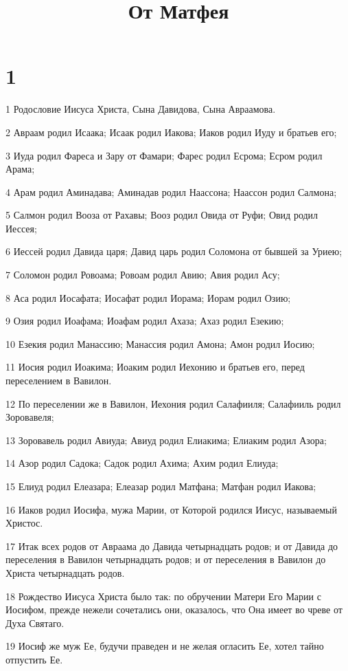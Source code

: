 

\title{От Матфея}


\chapter{1}

\par 1 Родословие Иисуса Христа, Сына Давидова, Сына Авраамова.
\par 2 Авраам родил Исаака; Исаак родил Иакова; Иаков родил Иуду и братьев его;
\par 3 Иуда родил Фареса и Зару от Фамари; Фарес родил Есрома; Есром родил Арама;
\par 4 Арам родил Аминадава; Аминадав родил Наассона; Наассон родил Салмона;
\par 5 Салмон родил Вооза от Рахавы; Вооз родил Овида от Руфи; Овид родил Иессея;
\par 6 Иессей родил Давида царя; Давид царь родил Соломона от бывшей за Уриею;
\par 7 Соломон родил Ровоама; Ровоам родил Авию; Авия родил Асу;
\par 8 Аса родил Иосафата; Иосафат родил Иорама; Иорам родил Озию;
\par 9 Озия родил Иоафама; Иоафам родил Ахаза; Ахаз родил Езекию;
\par 10 Езекия родил Манассию; Манассия родил Амона; Амон родил Иосию;
\par 11 Иосия родил Иоакима; Иоаким родил Иехонию и братьев его, перед переселением в Вавилон.
\par 12 По переселении же в Вавилон, Иехония родил Салафииля; Салафииль родил Зоровавеля;
\par 13 Зоровавель родил Авиуда; Авиуд родил Елиакима; Елиаким родил Азора;
\par 14 Азор родил Садока; Садок родил Ахима; Ахим родил Елиуда;
\par 15 Елиуд родил Елеазара; Елеазар родил Матфана; Матфан родил Иакова;
\par 16 Иаков родил Иосифа, мужа Марии, от Которой родился Иисус, называемый Христос.
\par 17 Итак всех родов от Авраама до Давида четырнадцать родов; и от Давида до переселения в Вавилон четырнадцать родов; и от переселения в Вавилон до Христа четырнадцать родов.
\par 18 Рождество Иисуса Христа было так: по обручении Матери Его Марии с Иосифом, прежде нежели сочетались они, оказалось, что Она имеет во чреве от Духа Святаго.
\par 19 Иосиф же муж Ее, будучи праведен и не желая огласить Ее, хотел тайно отпустить Ее.
